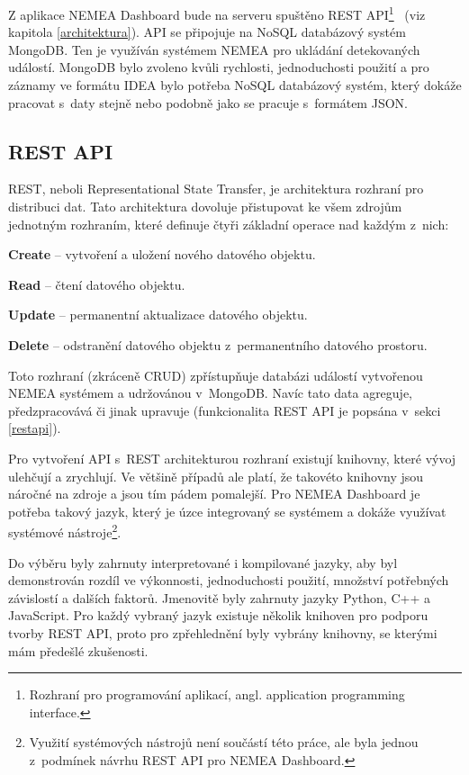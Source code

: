 Z aplikace NEMEA Dashboard bude na serveru spuštěno REST API\footnote{Rozhraní pro programování aplikací, angl. application programming interface.}~\cite{rest} (viz kapitola \ref{architektura}). API se připojuje na NoSQL databázový systém MongoDB. Ten je využíván systémem NEMEA pro ukládání detekovaných událostí. MongoDB bylo zvoleno kvůli rychlosti, jednoduchosti použití a pro záznamy ve formátu IDEA bylo potřeba NoSQL databázový systém, který dokáže pracovat s~daty stejně nebo podobně jako se pracuje s~formátem JSON.

\subsection{REST API}
\label{crud}

REST, neboli Representational State Transfer, je architektura rozhraní pro distribuci dat. Tato architektura dovoluje přistupovat ke všem zdrojům jednotným rozhraním, které definuje čtyři základní operace nad každým z~nich:

\begin{description}
    \item {\bf Create} -- vytvoření a uložení nového datového objektu.
    \item {\bf Read} -- čtení datového objektu.
    \item {\bf Update} -- permanentní aktualizace datového objektu.
    \item {\bf Delete} -- odstranění datového objektu z~permanentního datového prostoru.
\end{description}

Toto rozhraní (zkráceně CRUD) zpřístupňuje databázi událostí vytvořenou NEMEA systémem a udržovánou v~MongoDB. Navíc tato data agreguje, předzpracovává či jinak upravuje (funkcionalita REST API je popsána v~sekci \ref{restapi}).

Pro vytvoření API s~REST architekturou rozhraní existují knihovny, které vývoj ulehčují a zrychlují. Ve většině případů ale platí, že takovéto knihovny jsou náročné na zdroje a jsou tím pádem pomalejší. Pro NEMEA Dashboard je potřeba takový jazyk, který je úzce integrovaný se systémem a dokáže využívat systémové nástroje\footnote{Využití systémových nástrojů není součástí této práce, ale byla jednou z~podmínek návrhu REST API pro NEMEA Dashboard.}.

Do výběru byly zahrnuty interpretované i kompilované jazyky, aby byl demonstrován rozdíl ve výkonnosti, jednoduchosti použití, množství potřebných závislostí a dalších faktorů. Jmenovitě byly zahrnuty jazyky Python, C++ a JavaScript. Pro každý vybraný jazyk existuje několik knihoven pro podporu tvorby REST API, proto pro zpřehlednění byly vybrány knihovny, se kterými mám předešlé zkušenosti.

